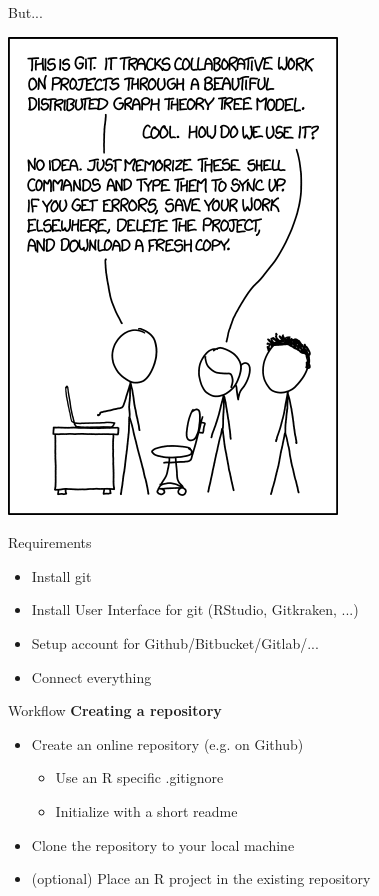\documentclass{beamer}\usepackage[]{graphicx}\usepackage[]{color}
\begin{document}
\begin{frame}{But...}
\begin{center}
\includegraphics[height=.75\textheight]{git_no_idea.png}
\end{center}
\end{frame}

\begin{frame}{Requirements}
\begin{itemize}
  \item Install git 
  \item Install User Interface for git (RStudio, Gitkraken, ...)
  \item Setup account for Github/Bitbucket/Gitlab/...
  \item Connect everything
\end{itemize}
\end{frame}

\begin{frame}{Workflow}
\textbf{Creating a repository}
\begin{itemize}
  \item Create an online repository (e.g. on Github)
  \begin{itemize}
    \item Use an R specific .gitignore
    \item Initialize with a short readme
  \end{itemize}
  \item Clone the repository to your local machine
  \item (optional) Place an R project in the existing repository
\end{itemize}
\end{frame}
\end{document}
